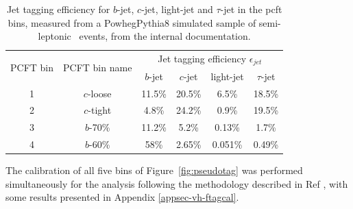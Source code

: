 \begin{itemize}
  \begin{table}[h!]
    \begin{center}
        \begin{tabular}{c|c|cccc}
          \hline \hline
          \multirow{2}{*}{PCFT bin} & \multirow{2}{*}{PCFT bin name} & \multicolumn{4}{c}{Jet tagging efficiency $\epsilon_{jet}$}\\
          & & $b$-jet &  $c$-jet &  light-jet & $\tau$-jet \\ 
          \hline
          1 & $c$-loose & 11.5\% & 20.5\% & 6.5\%   & 18.5\%\\
          2 & $c$-tight & 4.8\%  & 24.2\% & 0.9\%   & 19.5\%\\
          3 & $b$-70\%  & 11.2\% &  5.2\% & 0.13\%  &  1.7\%\\
          4 & $b$-60\%  & 58\%   & 2.65\% & 0.051\% & 0.49\%\\
          \hline \hline
        \end{tabular}
      \caption{Jet tagging efficiency for $b$-jet, $c$-jet, light-jet and $\tau$-jet in the \gls{pcft} bins, measured from a PowhegPythia8 simulated sample of semi-leptonic \ttb\ events, from the internal documentation.}
     \label{tbl:PCFTtageff}
    \end{center}
  \end{table}

  The calibration of all five bins of Figure~\ref{fig:pseudotag} was performed simultaneously for the analysis following the methodology described in Ref \cite{atlas:FTAGRUN2}, with some results presented in Appendix \ref{appsec-vh-ftagcal}.
  

\end{itemize}
